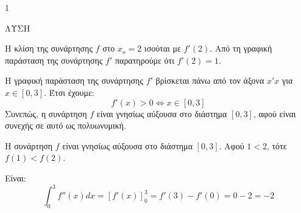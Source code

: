 \begin{ylh}{1}
    \item [Ύλη από εικόνα]
\end{ylh}
ΛΥΣΗ
\begin{alist}
\item Η κλίση της συνάρτησης $f$ στο $x_o = 2$ ισούται με $f'(2)$. Από τη γραφική παράσταση της συνάρτησης $f'$ παρατηρούμε ότι $f'(2) = 1$.
\item Η γραφική παράσταση της συνάρτησης $f'$ βρίσκεται πάνω από τον άξονα $x'x$ για $x \in [0,3]$. Έτσι έχουμε:
\[ f'(x) > 0 \Leftrightarrow x \in [0,3] \]
Συνεπώς, η συνάρτηση $f$ είναι γνησίως αύξουσα στο διάστημα $[0,3]$, αφού είναι συνεχής σε αυτό ως πολυωνυμική.
\item Η συνάρτηση $f$ είναι γνησίως αύξουσα στο διάστημα $[0,3]$. Αφού $1 < 2$, τότε $f(1) < f(2)$.
\item Είναι:
\[ \int_{0}^{3} f''(x)dx = [f'(x)]_{0}^{3} = f'(3) - f'(0) = 0 - 2 = -2 \]
\end{alist}